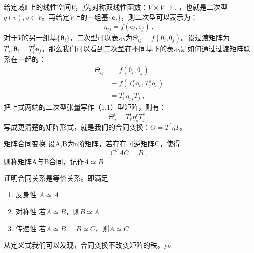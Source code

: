 

给定域$\mathbb F$上的线性空间$V$，$f$为对称双线性函数：$V\times V\to \mathbb F$，也就是二次型$q(v),v\in V$。再给定$V$上的一组基$\{\boldsymbol e_i\}$，则二次型可以表示为：
\begin{equation}
\eta_{ij}=f(\boldsymbol {\mathrm e}_i,\boldsymbol {\mathrm e}_j)~,
\end{equation}
对于$V$的另一组基$\{\boldsymbol \theta_i\}$，二次型可以表示为$\Theta_{ij}=f(\boldsymbol {\mathrm \theta}_{i},\boldsymbol {\mathrm \theta}_{j})$。设过渡矩阵为$T^i_j,\boldsymbol {\theta}_i=T^j_i\boldsymbol e_j$。那么我们可以看到二次型在不同基下的表示是如何通过过渡矩阵联系在一起的：
\begin{equation}
\begin{aligned}
\Theta_{ij}&=f(\boldsymbol {\mathrm \theta}_{i},\boldsymbol {\mathrm \theta}_{j})\\
&=f(T^r_i\boldsymbol e_r,T^s_j\boldsymbol e_s)\\
&=T^r_i \eta_{rs}T^s_j~,
\end{aligned}
\end{equation}
把上式两端的二次型张量写作（1,1）型矩阵，则有：
$$\Theta^i_j=T^i_r\eta^r_sT^s_j~,$$
写成更清楚的矩阵形式，就是我们的合同变换：$\Theta=T^T\eta T$。
\begin{definition}{矩阵合同变换}
设A,B为n阶矩阵，若存在可逆矩阵C，使得
\begin{equation}
C^TAC=B~,
\end{equation}
则称矩阵A与B合同，记作$A\simeq B$
\end{definition}
\begin{exercise}{}
证明合同关系是等价关系。即满足
\begin{enumerate}
\item 反身性  $A\simeq A$
\item 对称性  若$A\simeq B$，则$B\simeq A$
\item 传递性  若$A\simeq B,\quad B\simeq C$，则$A\simeq C$
\end{enumerate}
\end{exercise}
从定义式我们可以发现，合同变换不改变矩阵的秩。yo